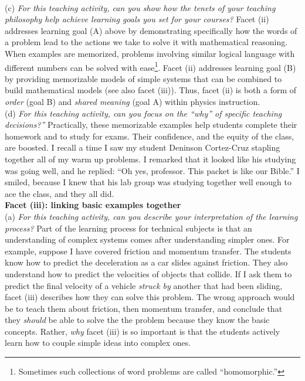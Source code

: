 \documentclass[../../../main.tex]{subfiles}
\begin{document}
\\
\vspace{0.25cm}
(c) \textit{For this teaching activity, can you show how the tenets of your teaching philosophy help achieve learning goals you set for your courses?}  Facet (ii) addresses learning goal (A) above by demonstrating specifically how the words of a problem lead to the actions we take to solve it with mathematical reasoning.  When examples are memorized, problems involving similar logical language with different numbers can be solved with ease\footnote{Sometimes such collections of word problems are called ``homomorphic.''}.  Facet (ii) addresses learning goal (B) by providing memorizable models of simple systems that can be combined to build mathematical models (see also facet (iii)).  Thus, facet (ii) is both a form of \textit{order} (goal B) and \textit{shared meaning} (goal A) within physics instruction.
\\
\vspace{0.25cm}
(d) \textit{For this teaching activity, can you focus on the ``why'' of specific teaching decisions?''} Practically, these memorizable examples help students complete their homework and to study for exams.  Their confidence, and the equity of the class, are boosted.  I recall a time I saw my student Deninson Cortez-Cruz stapling together all of my warm up problems.  I remarked that it looked like his studying was going well, and he replied: ``Oh yes, professor.  This packet is like our Bible.''  I smiled, because I knew that his lab group was studying together well enough to ace the class, and they all did.
\\
\vspace{0.25cm}
\textbf{Facet (iii): linking basic examples together}
\\
\vspace{0.25cm}
(a) \textit{For this teaching activity, can you describe your interpretation of the learning process?} Part of the learning process for technical subjects is that an understanding of complex systems comes after understanding simpler ones.  For example, suppose I have covered friction and momentum transfer.  The students know how to predict the deceleration as a car slides against friction.  They also understand how to predict the velocities of objects that collide.  If I ask them to predict the final velocity of a vehicle \textit{struck by} another that had been sliding, facet (iii) describes how they can solve this problem.  The wrong approach would be to teach them about friction, then momentum transfer, and conclude that they \textit{should} be able to solve the the problem because they know the basic concepts.  Rather, \textit{why} facet (iii) is so important is that the students actively learn how to couple simple ideas into complex ones.
\end{document}
